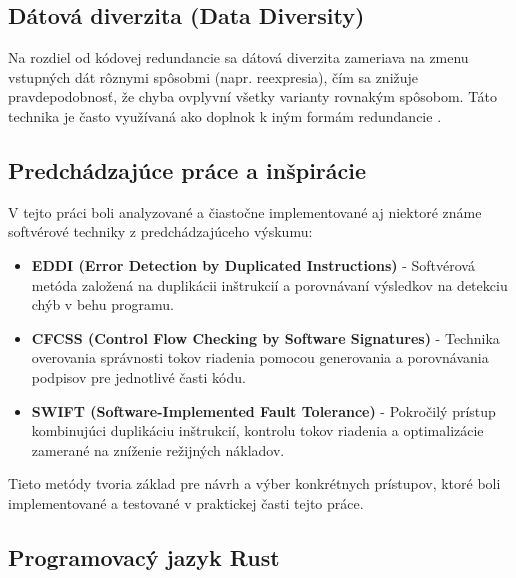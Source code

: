 \documentclass[12pt, letterpaper, slovak]{article}
\begin{document}
\subsection*{Dátová diverzita (Data Diversity)}

Na rozdiel od kódovej redundancie sa dátová diverzita zameriava na zmenu vstupných dát rôznymi spôsobmi (napr. reexpresia), čím sa znižuje pravdepodobnosť, že chyba ovplyvní všetky varianty rovnakým spôsobom. Táto technika je často využívaná ako doplnok k iným formám redundancie \cite{nasa:datadiversity}.

\subsection*{Predchádzajúce práce a inšpirácie}

V tejto práci boli analyzované a čiastočne implementované aj niektoré známe softvérové techniky z predchádzajúceho výskumu:

\begin{itemize}
\item \textbf{EDDI (Error Detection by Duplicated Instructions)} \cite{eddi} - Softvérová metóda založená na duplikácii inštrukcií a porovnávaní výsledkov na detekciu chýb v behu programu.
\item \textbf{CFCSS (Control Flow Checking by Software Signatures)} \cite{994926} - Technika overovania správnosti tokov riadenia pomocou generovania a porovnávania podpisov pre jednotlivé časti kódu.
\item \textbf{SWIFT (Software-Implemented Fault Tolerance)}\cite{swift} - Pokročilý prístup kombinujúci duplikáciu inštrukcií, kontrolu tokov riadenia a optimalizácie zamerané na zníženie režijných nákladov.
\end{itemize}

Tieto metódy tvoria základ pre návrh a výber konkrétnych prístupov, ktoré boli implementované a testované v praktickej časti tejto práce.

\subsection*{Programovacý jazyk Rust}
\end{document}
